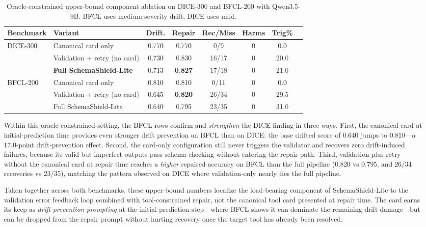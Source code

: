 \documentclass[runningheads]{llncs}
\newcommand{\method}{SchemaShield-Lite\xspace}
\begin{document}
\begin{table}[t]
\caption{Oracle-constrained upper-bound component ablation on DICE-300 and
BFCL-200 with Qwen3.5-9B. BFCL uses medium-severity drift, DICE uses mild.}
\label{tab:component-ablation}
\centering
\small
\begin{tabular}{llcccccc}
\toprule
Benchmark & Variant & Drift. & Repair & Rec/Miss & Harms & Trig\% \\
\midrule
\multirow{3}{*}{DICE-300}
& Canonical card only            & 0.770 & 0.770 & 0/9   & 0 & 0.0 \\
& Validation + retry (no card)   & 0.730 & 0.830 & 16/17 & 0 & 20.0 \\
& \textbf{Full \method}          & 0.713 & \textbf{0.827} & 17/18 & 0 & 21.0 \\
\midrule
\multirow{3}{*}{BFCL-200}
& Canonical card only            & 0.810 & 0.810 & 0/11  & 0 & 0.0 \\
& Validation + retry (no card)   & 0.645 & \textbf{0.820} & 26/34 & 0 & 29.5 \\
& Full \method                   & 0.640 & 0.795 & 23/35 & 0 & 31.0 \\
\bottomrule
\end{tabular}
\end{table}

Within this oracle-constrained setting, the BFCL rows confirm and \emph{strengthen}
the DICE finding in three ways.
First, the canonical card at initial-prediction time provides even stronger
drift prevention on BFCL than on DICE: the base drifted score of $0.640$ jumps
to $0.810$---a $17.0$-point drift-prevention effect. Second, the card-only
configuration still never triggers the validator and recovers zero
drift-induced failures, because its valid-but-imperfect outputs pass schema
checking without entering the repair path. Third, validation-plus-retry
without the canonical card at repair time reaches a \emph{higher} repaired
accuracy on BFCL than the full pipeline ($0.820$ vs $0.795$, and $26/34$
recoveries vs $23/35$), matching the pattern observed on DICE where
validation-only nearly ties the full pipeline.

Taken together across both benchmarks, these upper-bound numbers localize the
load-bearing component of \method to the validation error feedback loop
combined with tool-constrained repair, not the canonical tool card presented at
repair time. The card earns its keep as \emph{drift-prevention prompting}
at the initial prediction step---where BFCL shows it can dominate the
remaining drift damage---but can be dropped from the repair prompt without
hurting recovery once the target tool has already been resolved.
\end{document}
